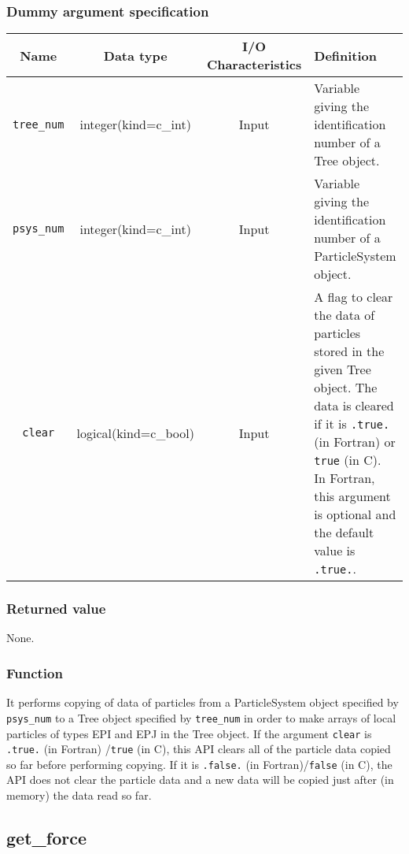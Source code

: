 \subsubsection*{Dummy argument specification}
\begin{table}[h]
\begin{tabularx}{\linewidth}{cccX}
\toprule
\rowcolor{Snow2}
Name & Data type & I/O Characteristics & Definition \\
\midrule
\verb|tree_num| & integer(kind=c\_int) & Input & Variable giving the identification number of a Tree object.\\
\verb|psys_num| & integer(kind=c\_int) & Input & Variable giving the identification number of a ParticleSystem object.\\
\verb|clear| & logical(kind=c\_bool) & Input & A flag to clear the data of particles stored in the given Tree object. The data is cleared if it is \texttt{.true.} {\small (in Fortran)} or \texttt{true} {\small (in C)}. In Fortran, this argument is optional and the default value is \texttt{.true.}.\\
\bottomrule
\end{tabularx}
\end{table}

\subsubsection*{Returned value}
None.

\subsubsection*{Function}
It performs copying of data of particles from a ParticleSystem object specified by \texttt{psys\_num} to a Tree object specified by \texttt{tree\_num} in order to make arrays of local particles of types EPI and EPJ in the Tree object. If the argument \texttt{clear} is \texttt{.true.} {\small (in Fortran)} /\texttt{true} {\small (in C)}, this API clears all of the particle data copied so far before performing copying. If it is \texttt{.false.} {\small (in Fortran)}/\texttt{false} {\small (in C)}, the API does not clear the particle data and a new data will be copied just after (in memory) the data read so far. 
\clearpage

\subsection{get\_force}
